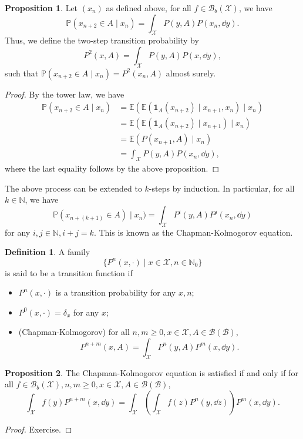 \documentclass[]{article}
\theoremstyle{definition}
\theoremstyle{definition}
\newtheorem{definition}{Definition}[section]
\newtheorem{proposition}{Proposition}[section]
\begin{document}
\begin{proposition}
  Let \((x_n)\) as defined above, for all \(f \in \mathcal{B}_b(\mathcal{X})\), 
  we have 
  \[\mathbb{P}(x_{n + 2} \in A \mid x_n) = \int_{\mathcal{X}}P(y, A)P(x_n, \dd y).\]
  Thus, we define the two-step transition probability by 
  \[P^2(x, A) = \int_{\mathcal{X}} P(y, A) P(x, \dd y),\]
  such that \(\mathbb{P}(x_{n + 2} \in A \mid x_n) = P^2(x_n, A)\) almost surely.
\end{proposition}
\begin{proof}
  By the tower law, we have 
  \[\begin{split}
    \mathbb{P}(x_{n + 2} \in A \mid x_n) & = \mathbb{E}(\mathbb{E}(\mathbf{1}_A(x_{n + 2}) \mid x_{n + 1}, x_n) \mid x_n)\\
    & = \mathbb{E}(\mathbb{E}(\mathbf{1}_A(x_{n + 2}) \mid x_{n + 1}) \mid x_n)\\
    & = \mathbb{E}(P(x_{n + 1}, A) \mid x_n)\\
    & = \int_{\mathcal{X}}P(y, A)P(x_n, \dd y),
  \end{split}\]
  where the last equality follows by the above proposition.
\end{proof}

The above process can be extended to \(k\)-steps by induction. In particular, 
for all \(k \in \mathbb{N}\), we have 
\[\mathbb{P}(x_{n + (k + 1)} \in A) \mid x_n) = 
  \int_{\mathcal{X}} P^i(y, A) P^j(x_n, \dd y)\]
for any \(i, j \in \mathbb{N}, i + j = k\). This is known as the Chapman-Kolmogorov 
equation.

\begin{definition}
  A family 
  \[\{P^n(x, \cdot) \mid x\in \mathcal{X}, n \in \mathbb{N}_0\}\]
  is said to be a transition function if 
  \begin{itemize}
    \item \(P^n(x, \cdot)\) is a transition probability for any \(x, n\);
    \item \(P^0(x, \cdot) = \delta_x\) for any \(x\);
    \item (Chapman-Kolmogorov) for all \(n, m \ge 0, x \in \mathcal{X}, A \in \mathcal{B}(\mathcal{B})\),
    \[P^{n + m}(x, A) = \int_{\mathcal{X}} P^n(y, A) P^m(x, \dd y).\]
  \end{itemize}
\end{definition}

\begin{proposition}
  The Chapman-Kolmogorov equation is satisfied if and only if for all 
  \(f \in \mathcal{B}_b(\mathcal{X}), n, m \ge 0, x \in \mathcal{X}, A \in \mathcal{B}(\mathcal{B})\), 
  \[\int_{\mathcal{X}}f(y)P^{n + m}(x, \dd y) = 
  \int_{\mathcal{X}}\left(\int_{\mathcal{X}} f(z) P^n(y, \dd z)\right) P^m(x, \dd y).\]
\end{proposition}
\begin{proof}
  Exercise.
\end{proof}
\end{document}
